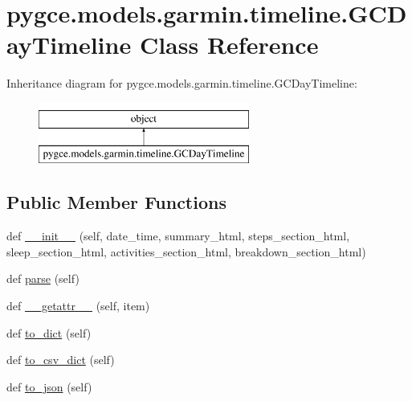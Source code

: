 \hypertarget{classpygce_1_1models_1_1garmin_1_1timeline_1_1_g_c_day_timeline}{}\section{pygce.\+models.\+garmin.\+timeline.\+G\+C\+Day\+Timeline Class Reference}
\label{classpygce_1_1models_1_1garmin_1_1timeline_1_1_g_c_day_timeline}
Inheritance diagram for pygce.\+models.\+garmin.\+timeline.\+G\+C\+Day\+Timeline\+:\begin{figure}[H]
\begin{center}
\leavevmode
\includegraphics[height=2.000000cm]{classpygce_1_1models_1_1garmin_1_1timeline_1_1_g_c_day_timeline}
\end{center}
\end{figure}
\subsection*{Public Member Functions}
\begin{DoxyCompactItemize}
\item 
def \hyperlink{classpygce_1_1models_1_1garmin_1_1timeline_1_1_g_c_day_timeline_a4dd53f447c45ea43629204d32243835e}{\+\_\+\+\_\+init\+\_\+\+\_\+} (self, date\+\_\+time, summary\+\_\+html, steps\+\_\+section\+\_\+html, sleep\+\_\+section\+\_\+html, activities\+\_\+section\+\_\+html, breakdown\+\_\+section\+\_\+html)
\item 
def \hyperlink{classpygce_1_1models_1_1garmin_1_1timeline_1_1_g_c_day_timeline_a868c632c33e0deb2b2ebfccfa35aa839}{parse} (self)
\item 
def \hyperlink{classpygce_1_1models_1_1garmin_1_1timeline_1_1_g_c_day_timeline_ae2d3f754907b22c3a87715fa8664cb5d}{\+\_\+\+\_\+getattr\+\_\+\+\_\+} (self, item)
\item 
def \hyperlink{classpygce_1_1models_1_1garmin_1_1timeline_1_1_g_c_day_timeline_aea84908a12fe244f70ef0c7d6f9875b7}{to\+\_\+dict} (self)
\item 
def \hyperlink{classpygce_1_1models_1_1garmin_1_1timeline_1_1_g_c_day_timeline_a89b4a28c05fc57f7588f9aea91c2f5f3}{to\+\_\+csv\+\_\+dict} (self)
\item 
def \hyperlink{classpygce_1_1models_1_1garmin_1_1timeline_1_1_g_c_day_timeline_a45e446687d33554cb53dea0a2d052c1a}{to\+\_\+json} (self)
\end{DoxyCompactItemize}
